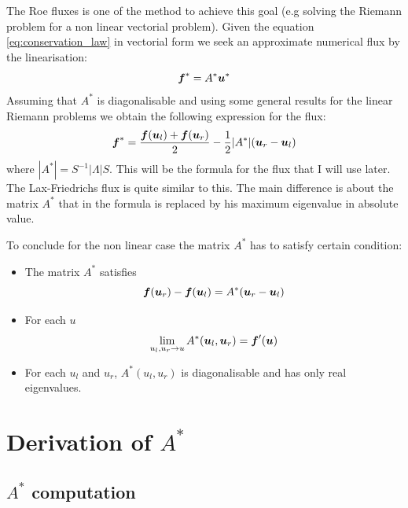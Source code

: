 \documentclass[oneside,12pt]{book}  %
\theoremstyle{plain}
\theoremstyle{definition}
\theoremstyle{remark}
\numberwithin{equation}{chapter} %
\begin{document}
The Roe fluxes is one of the method to achieve this goal (e.g solving
the Riemann problem for a non linear vectorial problem). 
Given the equation \ref{eq:conservation_law} in vectorial form we seek
an approximate numerical flux by the linearisation:
\begin{equation}
  \label{eq:linearization_roe}
  {\mbox{\boldmath$f$}}^*=A^*{\mbox{\boldmath$u$}}^*
\end{equation}
Assuming that $A^*$ is diagonalisable and using some general results
for the linear Riemann problems we obtain the following expression for
the flux:
\begin{equation}
  \label{eq:roe_flux}
  {\mbox{\boldmath$f$}}^*=\frac{{\mbox{\boldmath$f$}}({\mbox{\boldmath$u$}}_l)+{\mbox{\boldmath$f$}}({\mbox{\boldmath$u$}}_r)}{2} -\frac{1}{2}|A^*|({\mbox{\boldmath$u$}}_r-{\mbox{\boldmath$u$}}_l)
\end{equation}
where $|A^*|=S^{-1}|\Lambda | S$.
This will be the formula for the flux that I will use later.
The Lax-Friedrichs flux is quite similar to this. The main difference
is about the matrix $A^*$ that in the formula is replaced by his
maximum eigenvalue in absolute value.

To conclude for the non linear case the matrix $A^*$ has to satisfy
certain condition:
\begin{itemize}
\item
The matrix $A^*$ satisfies
\begin{equation}
  \label{eq:roe_condition1}
  {\mbox{\boldmath$f$}}({\mbox{\boldmath$u$}}_r)-{\mbox{\boldmath$f$}}({\mbox{\boldmath$u$}}_l)=A^*({\mbox{\boldmath$u$}}_r-{\mbox{\boldmath$u$}}_l)
\end{equation}
\item
For each $u$
\begin{equation}
  \label{eq:roe_condition2}
  \lim_{u_l,u_r \to u}A ^*({\mbox{\boldmath$u$}}_l,{\mbox{\boldmath$u$}}_r)={\mbox{\boldmath$f$}}'({\mbox{\boldmath$u$}})
\end{equation}
\item
For each $u_l$ and $u_r$, $A^*(u_l,u_r)$ is diagonalisable and has
only real eigenvalues.
\end{itemize}

\section{Derivation of $A^*$}

\subsection{$A^*$ computation}
\end{document}
